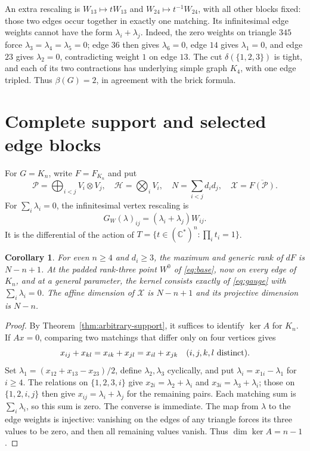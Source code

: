 \documentclass[11pt]{article}
\newtheorem{corollary}[theorem]{Corollary}
\theoremstyle{remark}\newtheorem{remark}[theorem]{Remark}
\newcommand{\C}{\mathbb C}
\newcommand{\cP}{\mathcal P}
\newcommand{\cH}{\mathcal H}
\newcommand{\cX}{\mathcal X}
\begin{document}
An extra rescaling is $W_{13}\mapsto tW_{13}$ and
$W_{24}\mapsto t^{-1}W_{24}$, with all other blocks fixed: those
two edges occur together in exactly one matching. Its infinitesimal
edge weights cannot have the form $\lambda_i+\lambda_j$.
Indeed, the zero weights on triangle $345$ force
$\lambda_3=\lambda_4=\lambda_5=0$; edge $36$ then gives
$\lambda_6=0$, edge $14$ gives $\lambda_1=0$, and edge $23$ gives
$\lambda_2=0$, contradicting weight $1$ on edge $13$.
The cut $\delta(\{1,2,3\})$ is tight, and each of its two contractions
has underlying simple graph $K_4$, with one edge tripled. Thus $\beta(G)=2$,
in agreement with the brick formula.


\section{Complete support and selected edge blocks}\label{sec:complete}
For $G=K_n$, write $F=F_{K_n}$ and put
\[
 \cP=\bigoplus_{i<j}V_i\otimes V_j,\quad
 \cH=\bigotimes_i V_i,\quad N=\sum_{i<j}d_id_j,\quad
 \cX=\overline{F(\cP)}.
\]
For $\sum_i\lambda_i=0$, the infinitesimal vertex rescaling is
\begin{equation}\label{eq:gauge}
 G_W(\lambda)_{ij}=(\lambda_i+\lambda_j)W_{ij}.
\end{equation}
It is the differential of the action of
$T=\{t\in(\C^*)^n:\prod_i t_i=1\}$.

\begin{corollary}\label{thm:main}
For even $n\geq4$ and $d_i\geq3$, the maximum and generic rank of $dF$ is $N-n+1$. At the padded rank-three point $W^0$ of \eqref{eq:base}, now on every edge of $K_n$, and at a general parameter, the kernel consists exactly of \eqref{eq:gauge} with $\sum_i\lambda_i=0$. The affine dimension of $\cX$ is $N-n+1$ and its projective dimension is $N-n$.
\end{corollary}
\begin{proof}
By Theorem~\ref{thm:arbitrary-support}, it suffices to identify $\ker A$ for $K_n$. If $Ax=0$, comparing two matchings that differ only on four vertices gives
\[
 x_{ij}+x_{kl}=x_{ik}+x_{jl}=x_{il}+x_{jk}
 \quad(i,j,k,l\textnormal{ distinct}).
\]
Set $\lambda_1=(x_{12}+x_{13}-x_{23})/2$, define $\lambda_2,\lambda_3$ cyclically, and put $\lambda_i=x_{1i}-\lambda_1$ for $i\geq4$. The relations on $\{1,2,3,i\}$ give $x_{2i}=\lambda_2+\lambda_i$ and $x_{3i}=\lambda_3+\lambda_i$; those on $\{1,2,i,j\}$ then give $x_{ij}=\lambda_i+\lambda_j$ for the remaining pairs. Each matching sum is $\sum_i\lambda_i$, so this sum is zero. The converse is immediate. The map from $\lambda$ to the edge weights is injective: vanishing on the edges of any triangle forces its three values to be zero, and then all remaining values vanish. Thus $\dim\ker A=n-1$.
\end{proof}
\end{document}
